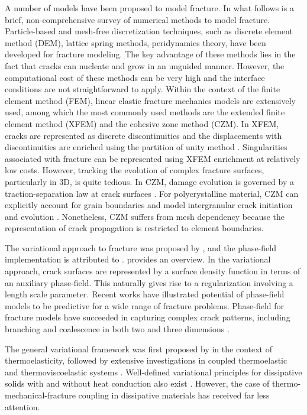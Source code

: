 A number of models have been proposed to model fracture. In what follows is a brief, non-comprehensive survey of numerical methods to model fracture. Particle-based and mesh-free discretization techniques, such as discrete element method (DEM), lattice spring methods, peridynamics theory, have been developed for fracture modeling. The key advantage of these methods lies in the fact that cracks can nucleate and grow in an unguided manner. However, the computational cost of these methods can be very high and the interface conditions are not straightforward to apply. Within the context of the finite element method (FEM), linear elastic fracture mechanics models are extensively used, among which the most commonly used methods are the extended finite element method (XFEM) and the cohesive zone method (CZM). In XFEM, cracks are represented as discrete discontinuities and the displacements with discontinuities are enriched using the partition of unity method \cite{babuaka1997, Dolbow99}. Singularities associated with fracture can be represented using XFEM enrichment at relatively low costs. However, tracking the evolution of complex fracture surfaces, particularly in 3D, is quite tedious. In CZM, damage evolution is governed by a traction-separation law at crack surfaces \cite{needleman_1992, ortiz_1999}. For polycrystalline material, CZM can explicitly account for grain boundaries and model intergranular crack initiation and evolution \cite{KAMAYA2007, KAMAYA2009}. Nonetheless, CZM suffers from mesh dependency because the representation of crack propagation is restricted to element boundaries.

The variational approach to fracture was proposed by \citet{Francfort98}, and the phase-field implementation is attributed to \citet{Bourdin2000}.
\citet{bourdin2008variational} provides an overview.  In the variational approach, crack surfaces are represented by a surface density function in terms of an auxiliary phase-field. This naturally gives rise to a regularization involving a length scale parameter. Recent works have illustrated potential of phase-field models to be predictive for a wide range of fracture problems. Phase-field for fracture models have succeeded in capturing complex crack patterns, including branching and coalescence in both two and three dimensions \cite{karma_2001, karma_2004, henry_2004, spatschek_2007, amor_2009}.

The general variational framework was first proposed by \citet{biot1956thermoelasticity} in the context of thermoelasticity, followed by extensive investigations in coupled thermoelastic and thermoviscoelastic systems \cite{herrmann1963variational,ben1965variational,oden2012variational,molinari1987global,batra1989principle,matsubara2021variationally}. Well-defined variational principles for dissipative solids with and without heat conduction also exist \cite{ortiz_1999,yang2006variational}. However, the case of thermo-mechanical-fracture coupling in dissipative materials has received far less attention.

